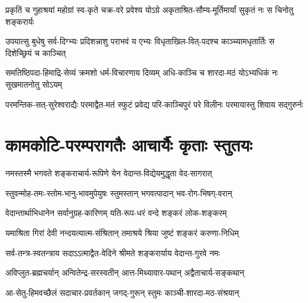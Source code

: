 \twolineshloka
{प्रकृतिं च गुहाश्रयां महोग्रां स्व-कृते चक्र-वरे प्रवेश्य योऽग्रे}
{अकृताश्रित-सौम्य-मूर्तिमार्यां सुकृतं नः स चिनोतु शङ्करार्यः}

\twolineshloka
{उपयात्सु बुधेषु सर्व-दिग्भ्यः प्रदिशन्नाशु पराभवं य एभ्यः}
{विधृताखिल-वित्-पदश्च काञ्च्यामधृतार्तिः स दिशेच्छ्रियं च काञ्चित्}

\twolineshloka
{समतिष्ठिपदा-हिमाद्रि-सेव्यं क्रमशो धर्म-विचारणाय दिव्यम्}
{अधि-काञ्चि च शारदा-मठं योऽभ्यधिकं नः सुखमातनोतु सोऽयम्}

\twolineshloka
{परमन्तिक-सत्-सुरेश्वराद्यैः परमाद्वैत-मतं स्फुटं प्रवेद्य}
{परि-काञ्चिपुरं परे विलीनः परमायास्तु शिवाय सद्गुरुर्नः}


\section{कामकोटि-परम्परागतैः आचार्यैः कृताः स्तुतयः}

\twolineshloka
{नमस्तस्मै भगवते शङ्कराचार्य-रूपिणे}
{येन वेदान्त-विद्येयमुद्धृता वेद-सागरात्}


\twolineshloka
{स्तुवन्मोह-तमः-स्तोम-भानु-भावमुपेयुषः}
{स्तुमस्तान् भगवत्पादान् भव-रोग-भिषग्-वरान्}


\twolineshloka
{वेदान्तार्थाभिधानेन सर्वानुग्रह-कारिणम्}
{यति-रूप-धरं वन्दे शङ्करं लोक-शङ्करम्}


\twolineshloka
{यमाश्रिता गिरां देवी नन्दयत्यात्म-संश्रितान्}
{तमाश्रये श्रिया जुष्टं शङ्करं करुणा-निधिम्}


\twolineshloka
{सर्व-तन्त्र-स्वतन्त्राय सदाऽऽत्माद्वैत-वेदिने}
{श्रीमते शङ्करार्याय वेदान्त-गुरवे नमः}

\twolineshloka
{अविप्लुत-ब्रह्मचर्यान् अन्वितेन्द्र-सरस्वतीन्}
{आत्त-मिथ्यावार-पथान् अद्वैताचार्य-सङ्कथान्}

\twolineshloka
{आ-सेतु-हिमवच्छैलं सदाचार-प्रवर्तकान्}
{जगद्-गुरून् स्तुमः काञ्ची-शारदा-मठ-संश्रयान्}


